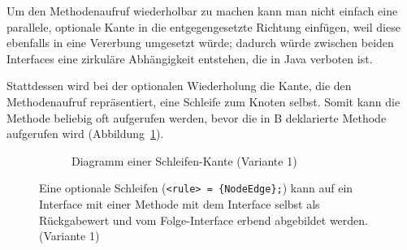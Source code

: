 \documentclass[../InterneDSLs.tex]{subfiles}
\begin{document}
Um den Methodenaufruf wiederholbar zu machen kann man nicht einfach eine parallele, optionale Kante in die entgegengesetzte Richtung einfügen, weil diese ebenfalls in eine Vererbung umgesetzt würde; dadurch würde zwischen beiden Interfaces eine zirkuläre Abhängigkeit entstehen, die in Java verboten ist.

Stattdessen wird bei der optionalen Wiederholung die Kante, die den Methodenaufruf repräsentiert, eine Schleife zum Knoten selbst. Somit kann die Methode beliebig oft aufgerufen werden, bevor die in B deklarierte Methode aufgerufen wird (Abbildung~\ref{FIG:DiagramLoopNode}).
\begin{figure}[ht]
\centering
  \begin{subfigure}[c]{0.49\textwidth}
    \caption{Diagramm einer Schleifen-Kante (Variante 1)}
    \label{FIG:DiagramLoopNode}
  \end{subfigure}
  \begin{subfigure}[c]{0.49\textwidth}
    
  \end{subfigure}
  \caption[Abbildung einer optionalen Schleife (Variante 1)]{Eine optionale Schleifen (\texttt{<rule> = \{NodeEdge\};}) kann auf ein Interface mit einer Methode mit dem Interface selbst als Rückgabewert und vom Folge-Interface erbend abgebildet werden. (Variante 1)}
  \label{FIG:LoopNode}
\end{figure}
\end{document}
